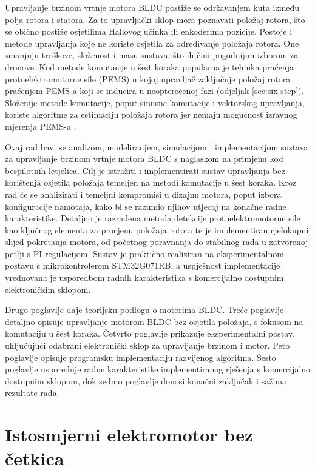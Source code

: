 \documentclass[diplomskirad]{fer}
\begin{document}
Upravljanje brzinom vrtnje motora BLDC postiže se održavanjem kuta između polja
rotora i statora. Za to upravljački sklop mora poznavati položaj rotora, što se
obično postiže osjetilima Hallovog učinka ili enkoderima pozicije. Postoje i
metode upravljanja koje ne koriste osjetila za određivanje položaja rotora. One
smanjuju troškove, složenost i masu sustava, što ih čini pogodnijim izborom za
dronove. Kod metode komutacije u šest koraka popularna je tehnika praćenja
protuelektromotorne sile (PEMS) u kojoj upravljač zaključuje položaj rotora
praćenjem PEMS-a koji se inducira u neopterećenoj fazi (odjeljak
\ref{sec:six-step}). Složenije metode komutacije, poput sinusne komutacije i
vektorskog upravljanja, koriste algoritme za estimaciju položaja rotora jer
nemaju mogućnost izravnog mjerenja PEMS-a \cite{NXP_AN2355}.


Ovaj rad bavi se analizom, modeliranjem, simulacijom i implementacijom sustava
za upravljanje brzinom vrtnje motora BLDC s naglaskom na primjenu kod
bespilotnih letjelica. Cilj je istražiti i implementirati sustav upravljanja
bez korištenja osjetila položaja temeljen na metodi komutacije u šest koraka.
Kroz rad će se analizirati i temeljni kompromisi u dizajnu motora, poput izbora
konfiguracije namotaja, kako bi se razumio njihov utjecaj na konačne radne
karakteristike. Detaljno je razrađena metoda detekcije protuelektromotorne sile
kao ključnog elementa za procjenu položaja rotora te je implementiran
cjelokupni slijed pokretanja motora, od početnog poravnanja do stabilnog rada u
zatvorenoj petlji s PI regulacijom. Sustav je praktično realiziran na
eksperimentalnom postavu s mikrokontrolerom STM32G071RB, a uspješnost
implementacije vrednovana je usporedbom radnih karakteristika s komercijalno
dostupnim elektroničkim sklopom.

Drugo poglavlje daje teorijsku podlogu o motorima BLDC. Treće poglavlje
detaljno opisuje upravljanje motorom BLDC bez osjetila položaja, s fokusom na
komutaciju u šest koraka. Četvrto poglavlje prikazuje eksperimentalni postav,
uključujući odabrani elektronički sklop za upravljanje brzinom i motor. Peto
poglavlje opisuje programsku implementaciju razvijenog algoritma. Šesto
poglavlje uspoređuje radne karakteristike implementiranog rješenja s
komercijalno dostupnim sklopom, dok sedmo poglavlje donosi konačni zaključak i
sažima rezultate rada.
\chapter{Istosmjerni elektromotor bez četkica}
\label{pog:bldc}
\end{document}
